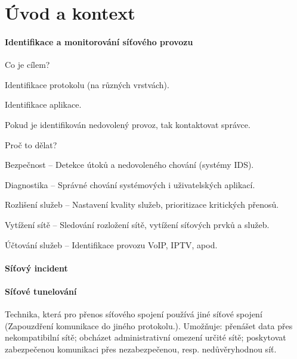 
\section{Úvod a kontext}

\paragraph*{Identifikace a monitorování síťového provozu} \begin{compactitem}
    \item Co je cílem? \begin{compactitem}
        \item Identifikace protokolu (na různých vrstvách).
        \item Identifikace aplikace.
        \item Pokud je identifikován nedovolený provoz, tak kontaktovat správce.
    \end{compactitem}
    \item Proč to dělat? \begin{compactitem}
        \item Bezpečnost -- Detekce útoků a nedovoleného chování (systémy IDS).
        \item Diagnostika -- Správné chování systémových i uživatelských aplikací.
        \item Rozlišení služeb -- Nastavení kvality služeb, prioritizace kritických přenosů.
        \item Vytížení sítě -- Sledování rozložení sítě, vytížení síťových prvků a služeb.
        \item Účtování služeb -- Identifikace provozu VoIP, IPTV, apod.
    \end{compactitem}
\end{compactitem}

\paragraph*{Síťový incident} 

\paragraph*{Síťové tunelování} Technika, která pro přenos síťového spojení používá jiné síťové spojení (Zapouzdření komunikace do jiného protokolu.). Umožňuje: přenášet data přes nekompatibilní sítě; obcházet administrativní omezení určité sítě; poskytovat zabezpečenou komunikaci přes nezabezpečenou, resp. nedůvěryhodnou síť.

